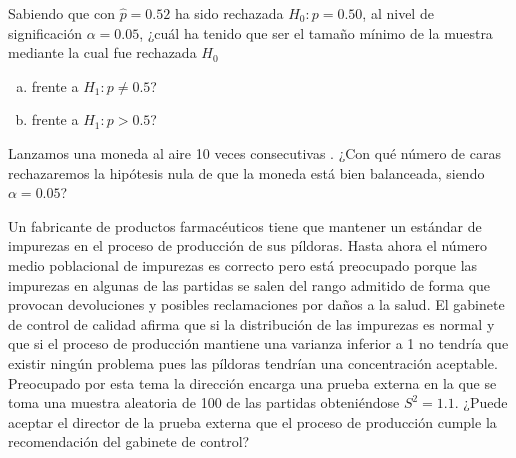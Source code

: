 \documentclass[12pt]{article}\usepackage[]{graphicx}\usepackage[]{color}
\begin{document}
\begin{prob}
Sabiendo que con $\hat{p}=0.52$ ha sido rechazada $H_{0}:p=0.50$, al
nivel de significación $\alpha=0.05$, ¿cuál ha tenido que ser el
tamaño mínimo de la muestra mediante la cual fue rechazada
$H_{0}$

\begin{enumerate}[a)]
\item frente a $H_{1}:p\not=0.5$?
\item frente a $H_{1}:p>0.5$?
\end{enumerate}

\begin{prob}
Lanzamos una moneda al aire 10 veces consecutivas . ¿Con qué número
de caras rechazaremos la hipótesis nula de que la moneda está bien
balanceada, siendo $\alpha=0.05$?
\end{prob}
\end{prob}



\begin{prob}%
Un fabricante de productos farmacéuticos tiene que mantener un estándar de impurezas en el
proceso de producción de sus píldoras. Hasta ahora el número medio poblacional de impurezas
es correcto pero está preocupado porque las impurezas en algunas de las partidas se salen
del rango admitido de forma que provocan devoluciones y posibles reclamaciones por daños a
la salud. El gabinete de control de calidad afirma que si la distribución de las impurezas
es normal y que si el proceso de producción mantiene  una varianza inferior a 1 no tendría
que existir ningún problema pues las píldoras tendrían una concentración aceptable.
Preocupado por esta tema la dirección encarga una prueba externa en la que se toma una
muestra aleatoria de 100 de las partidas obteniéndose $S^2=1.1$. ¿Puede aceptar el director
de la prueba externa que el proceso de producción cumple la recomendación del gabinete de
control?
\end{prob}
\end{document}
